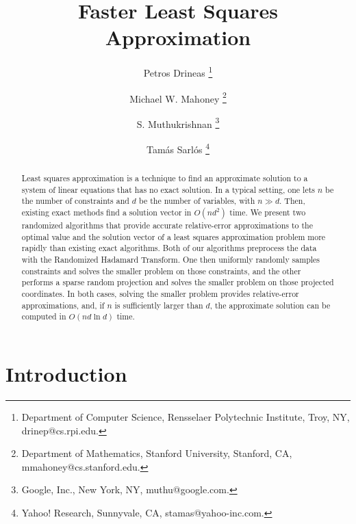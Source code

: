 \documentclass[11pt]{article}
\begin{document}
\title{Faster Least Squares Approximation}

\author{
Petros Drineas
\thanks{
Department of Computer Science,
Rensselaer Polytechnic Institute,
Troy, NY,
drinep@cs.rpi.edu.
}
\and Michael W. Mahoney
\thanks{
Department of Mathematics,
Stanford University,
Stanford, CA,
mmahoney@cs.stanford.edu.
}
\and S. Muthukrishnan
\thanks{
Google, Inc., New York, NY, muthu@google.com.}
\and Tam\'{a}s Sarl\'{o}s
\thanks{
Yahoo! Research, Sunnyvale, CA, stamas@yahoo-inc.com.}
}

\date{}
\maketitle
\vspace{5mm}

\begin{abstract}
Least squares approximation is a technique to find an approximate solution to a system of linear equations that has no exact solution. In a typical setting, one lets $n$ be the number of constraints and $d$ be the number of variables, with $n \gg d$. Then, existing exact methods find a solution vector in $O(nd^2)$ time. We present two randomized algorithms that provide accurate relative-error approximations to the optimal value and the solution vector of a least squares approximation problem more rapidly than existing exact algorithms. Both of our algorithms preprocess the data with the Randomized Hadamard Transform. One then uniformly randomly samples constraints and solves the smaller problem on those constraints, and the other performs a sparse random projection and solves the smaller problem on those projected coordinates. In both cases, solving the smaller problem provides relative-error approximations, and, if $n$ is sufficiently larger than $d$, the approximate solution can be computed in $O(nd \ln d)$ time.
\end{abstract}

\vspace{5mm}
\section{Introduction}
\label{sxn:intro}
\end{document}
